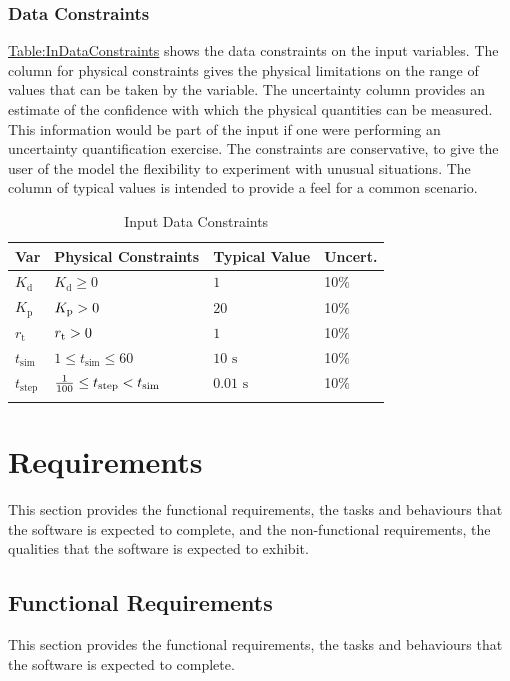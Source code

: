 \documentclass[12pt]{article}
\newcommand{\gt}{\ensuremath >}
\newcommand{\lt}{\ensuremath <}
\begin{document}
\subsubsection{Data Constraints}
\label{Sec:DataConstraints}
\hyperref[Table:InDataConstraints]{Table:InDataConstraints} shows the data constraints on the input variables. The column for physical constraints gives the physical limitations on the range of values that can be taken by the variable. The uncertainty column provides an estimate of the confidence with which the physical quantities can be measured. This information would be part of the input if one were performing an uncertainty quantification exercise. The constraints are conservative, to give the user of the model the flexibility to experiment with unusual situations. The column of typical values is intended to provide a feel for a common scenario.

\begin{longtable}{l l l l}
\toprule
\textbf{Var} & \textbf{Physical Constraints} & \textbf{Typical Value} & \textbf{Uncert.}
\\
\midrule
\endhead
${K_{\text{d}}}$ & ${K_{\text{d}}}\geq{}0$ & $1$ & 10$\%$
\\
${K_{\text{p}}}$ & ${K_{\text{p}}}\gt{}0$ & $20$ & 10$\%$
\\
${r_{\text{t}}}$ & ${r_{\text{t}}}\gt{}0$ & $1$ & 10$\%$
\\
${t_{\text{sim}}}$ & $1\leq{}{t_{\text{sim}}}\leq{}60$ & $10$ ${\text{s}}$ & 10$\%$
\\
${t_{\text{step}}}$ & $\frac{1}{100}\leq{}{t_{\text{step}}}\lt{}{t_{\text{sim}}}$ & $0.01$ ${\text{s}}$ & 10$\%$
\\
\bottomrule
\caption{Input Data Constraints}
\label{Table:InDataConstraints}
\end{longtable}
\section{Requirements}
\label{Sec:Requirements}
This section provides the functional requirements, the tasks and behaviours that the software is expected to complete, and the non-functional requirements, the qualities that the software is expected to exhibit.

\subsection{Functional Requirements}
\label{Sec:FRs}
This section provides the functional requirements, the tasks and behaviours that the software is expected to complete.
\end{document}
